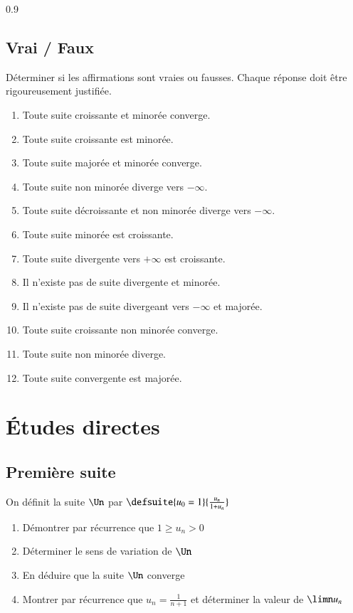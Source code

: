 \documentclass[oneside,12pt]{article}          %
\begin{document}
\begin{spacing}{0.9}
\subsection{Vrai / Faux}

Déterminer si les affirmations sont vraies ou fausses. Chaque réponse doit être rigoureusement justifiée.
\begin{enumerate}
	\item Toute suite croissante et minorée converge.
    \item Toute suite croissante est minorée.
    \item Toute suite majorée et minorée converge.
    \item Toute suite non minorée diverge vers $-\infty$.
    \item Toute suite décroissante et non minorée diverge vers $-\infty$.
    \item Toute suite minorée est croissante.
    \item Toute suite divergente vers $+\infty$ est croissante.
    \item Il n'existe pas de suite divergente et minorée.
    \item Il n'existe pas de suite divergeant vers $-\infty$ et majorée.
    \item Toute suite croissante non minorée converge.
	\item Toute suite non minorée diverge.
    \item Toute suite convergente est majorée.
\end{enumerate}



\section{Études directes}

\subsection{Première suite}
On définit la suite $\Un$ par $\defsuite{u_0=1}{\frac{u_n}{1+u_n}}$
\begin{enumerate}
    \item Démontrer par récurrence que $1\geq u_n>0$
    \item Déterminer le sens de variation de $\Un$
    \item En déduire que la suite $\Un$ converge
    \item Montrer par récurrence que $u_n=\frac{1}{n+1}$  et déterminer la valeur de $\limn u_n$
\end{enumerate}




\end{spacing}
\end{document}
